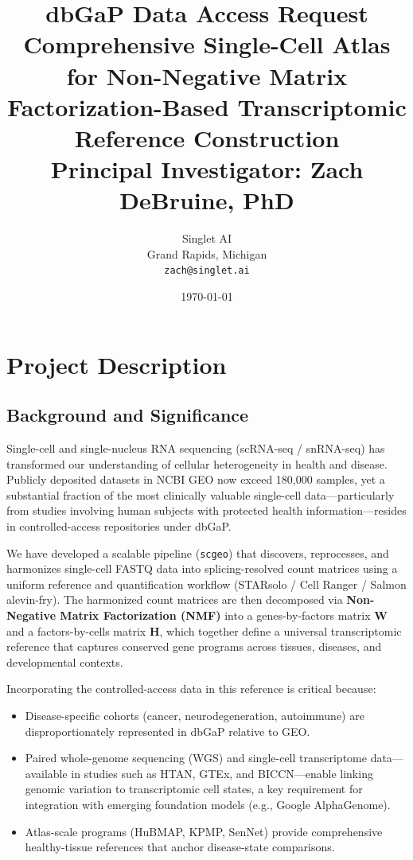 \documentclass[11pt,letterpaper]{article}
\title{%
    \vspace{-1.5cm}
    \textbf{dbGaP Data Access Request}\\[0.3em]
    \large Comprehensive Single-Cell Atlas for Non-Negative Matrix\\
    Factorization-Based Transcriptomic Reference Construction\\[0.3em]
    \normalsize Principal Investigator: Zach DeBruine, PhD
}
\author{
    Singlet AI\\
    Grand Rapids, Michigan\\
    \texttt{zach@singlet.ai}
}
\date{\today}
\begin{document}
\maketitle
\thispagestyle{fancy}

\section{Project Description}

\subsection{Background and Significance}

Single-cell and single-nucleus RNA sequencing (scRNA-seq / snRNA-seq) has
transformed our understanding of cellular heterogeneity in health and
disease. Publicly deposited datasets in NCBI GEO now exceed 180,000
samples, yet a substantial fraction of the most clinically valuable
single-cell data---particularly from studies involving human subjects
with protected health information---resides in controlled-access
repositories under dbGaP.

We have developed a scalable pipeline (\texttt{scgeo}) that discovers,
reprocesses, and harmonizes single-cell FASTQ data into
splicing-resolved count matrices using a uniform reference and
quantification workflow (STARsolo / Cell Ranger / Salmon alevin-fry).
The harmonized count matrices are then decomposed via
\textbf{Non-Negative Matrix Factorization (NMF)} into a genes-by-factors
matrix $\mathbf{W}$ and a factors-by-cells matrix $\mathbf{H}$, which
together define a universal transcriptomic reference that captures
conserved gene programs across tissues, diseases, and developmental
contexts.

Incorporating the controlled-access data in this reference is critical
because:
\begin{itemize}[nosep]
    \item Disease-specific cohorts (cancer, neurodegeneration,
          autoimmune) are disproportionately represented in dbGaP
          relative to GEO.
    \item Paired whole-genome sequencing (WGS) and single-cell
          transcriptome data---available in studies such as HTAN, GTEx,
          and BICCN---enable linking genomic variation to
          transcriptomic cell states, a key requirement for integration
          with emerging foundation models (e.g., Google AlphaGenome).
    \item Atlas-scale programs (HuBMAP, KPMP, SenNet) provide
          comprehensive healthy-tissue references that anchor
          disease-state comparisons.
\end{itemize}
\end{document}
